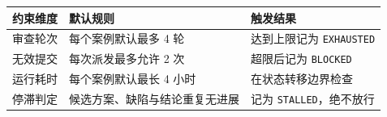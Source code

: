 \begin{tabular}{@{}P{3.0cm}P{4.6cm}P{4.9cm}@{}}
\toprule
\textbf{约束维度} & \textbf{默认规则} & \textbf{触发结果} \\
\midrule
审查轮次 & 每个案例默认最多 4 轮 & 达到上限记为 \texttt{EXHAUSTED} \\
无效提交 & 每次派发最多允许 2 次 & 超限后记为 \texttt{BLOCKED} \\
运行耗时 & 每个案例默认最长 4 小时 & 在状态转移边界检查 \\
停滞判定 & 候选方案、缺陷与结论重复无进展 & 记为 \texttt{STALLED}，绝不放行 \\
\bottomrule
\end{tabular}
